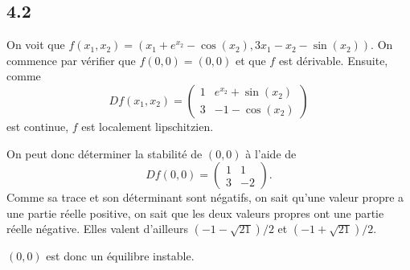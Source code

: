 \documentclass{article}
\begin{document}
\subsection*{4.2}
On voit que $f(x_1,x_2) = (x_1 + e^{x_2} - \cos(x_2), 3x_1 - x_2 - \sin(x_2))$.
On commence par vérifier que $f(0,0) = (0,0)$ et que $f$ est dérivable.
Ensuite, comme
\[ Df(x_1,x_2) =
\begin{pmatrix}
  1 & e^{x_2} + \sin(x_2)\\
  3 & -1 - \cos(x_2)
\end{pmatrix} \]
est continue, $f$ est localement lipschitzien.

On peut donc déterminer la stabilité de $(0,0)$ à l'aide de
\[ Df(0, 0) =
\begin{pmatrix}
  1 & 1\\
  3 & -2
\end{pmatrix}. \]
Comme sa trace et son déterminant sont négatifs,
on sait qu'une valeur propre a une partie réelle positive,
on sait que les deux valeurs propres ont une partie réelle négative.
Elles valent d'ailleurs $(-1 - \sqrt{21})/2$ et $(-1+\sqrt{21})/2$.

$(0,0)$ est donc un équilibre instable.
\end{document}
